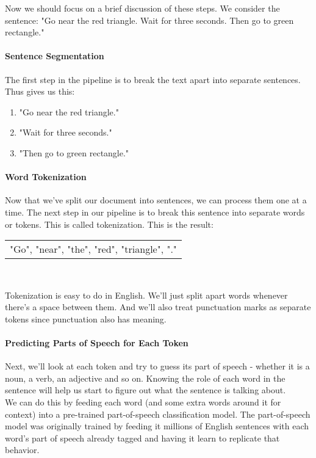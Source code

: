 Now we should focus on a brief discussion of these steps. We consider the sentence: "Go near the red triangle. Wait for three seconds. Then go to green rectangle."\\

\paragraph{Sentence Segmentation}
The first step in the pipeline is to break the text apart into separate sentences. Thus gives us this:
\begin{enumerate}
    \item "Go near the red triangle."
    \item "Wait for three seconds."
    \item "Then go to green rectangle."
\end{enumerate}

\paragraph{Word Tokenization}
Now that we’ve split our document into sentences, we can process them one at a time. The next step in our pipeline is to break this sentence into separate words or tokens. This is called tokenization. This is the result: \\

\begin{tabular}{|p{10cm}}
    "Go", "near", "the", "red", "triangle", "." 
\end{tabular}\\
\vline


Tokenization is easy to do in English. We’ll just split apart words whenever there’s a space between them. And we’ll also treat punctuation marks as separate tokens since punctuation also has meaning.

\paragraph{Predicting Parts of Speech for Each Token}
Next, we'll look at each token and try to guess its part of speech - whether it is a noun, a verb, an adjective and so on. Knowing the role of each word in the sentence will help us start to figure out what the sentence is talking about.\\


We can do this by feeding each word (and some extra words around it for context) into a pre-trained part-of-speech classification model. The part-of-speech model was originally trained by feeding it millions of English sentences with each word’s part of speech already tagged and having it learn to replicate that behavior.\\

